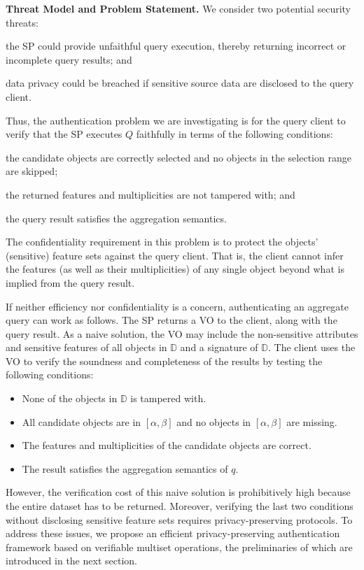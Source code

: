 \textbf{Threat Model and Problem Statement.} We consider two potential security threats:
\begin{inlineenum}
\item the SP could provide unfaithful query execution, thereby returning incorrect or incomplete query results; and
\item data privacy could be breached if sensitive source data are disclosed to the query client.
\end{inlineenum}
Thus, the authentication problem we are investigating is for the query client to verify that the SP executes $Q$ faithfully in terms of the following conditions:
\begin{inlineenum}
\item the candidate objects are correctly selected and no objects in the selection range are skipped;
\item the returned features and multiplicities are not tampered with; and
\item the query result satisfies the aggregation semantics.
\end{inlineenum}
The confidentiality requirement in this problem is to protect the objects' (sensitive) feature sets against the query client. That is, the client cannot infer the features (as well as their multiplicities) of any single object beyond what is implied from the query result.

If neither efficiency nor confidentiality is a concern, authenticating an aggregate query can work as follows. The SP returns a VO to the client, along with the query result. As a naive solution, the VO may include the non-sensitive attributes and sensitive features of all objects in $\mathbb{D}$ and a signature of $\mathbb{D}$. The client uses the VO to verify the soundness and completeness of the results by testing the following conditions:
\begin{itemize}
  \item None of the objects in $\mathbb{D}$ is tampered with.
  \item All candidate objects are in $[\alpha, \beta]$ and no objects in $[\alpha, \beta]$ are missing.
  \item The features and multiplicities of the candidate objects are correct.
  \item The result  satisfies the aggregation semantics of $q$.
\end{itemize}

However, the verification cost of this naive solution is prohibitively high because the entire dataset has to be returned. Moreover, verifying the last two conditions without disclosing sensitive feature sets requires privacy-preserving protocols. To address these issues, we propose an efficient privacy-preserving authentication framework based on verifiable multiset operations, the preliminaries of which are introduced in the next section.

